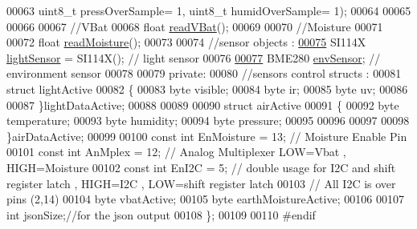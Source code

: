 \begin{DoxyCode}
00063                    uint8\_t pressOverSample= 1,    uint8\_t humidOverSample= 1);
00064 
00065 
00066 
00067     \textcolor{comment}{//VBat}
00068     \textcolor{keywordtype}{float} \hyperlink{class_cool_board_sensors_a6944b6ea7bce8e2fce1b434acfd9d5f3}{readVBat}();
00069 
00070     \textcolor{comment}{//Moisture}
00071 
00072     \textcolor{keywordtype}{float} \hyperlink{class_cool_board_sensors_a8761bff50373c485f4465c8db47d0633}{readMoisture}();
00073 
00074     \textcolor{comment}{//sensor objects :}
\hyperlink{class_cool_board_sensors_a3e397300fb707dd193e909a757bf6102}{00075}     SI114X \hyperlink{class_cool_board_sensors_a3e397300fb707dd193e909a757bf6102}{lightSensor} = SI114X();           \textcolor{comment}{// light sensor }
00076     
\hyperlink{class_cool_board_sensors_a868e38985e9a2412829fa2790ca13e2e}{00077}     BME280 \hyperlink{class_cool_board_sensors_a868e38985e9a2412829fa2790ca13e2e}{envSensor};                  \textcolor{comment}{// environment sensor}
00078     
00079 \textcolor{keyword}{private}:
00080     \textcolor{comment}{//sensors control structs :}
00081     \textcolor{keyword}{struct }lightActive
00082     \{
00083         byte visible;
00084         byte ir;
00085         byte uv;    
00086 
00087     \}lightDataActive;
00088 
00089 
00090     \textcolor{keyword}{struct }airActive
00091     \{
00092         byte temperature;
00093         byte humidity;
00094         byte pressure;
00095 
00096 
00097 
00098     \}airDataActive;
00099 
00100     \textcolor{keyword}{const} \textcolor{keywordtype}{int} EnMoisture = 13;                      \textcolor{comment}{// Moisture Enable Pin}
00101     \textcolor{keyword}{const} \textcolor{keywordtype}{int} AnMplex = 12;                         \textcolor{comment}{// Analog Multiplexer  LOW=Vbat , HIGH=Moisture}
00102     \textcolor{keyword}{const} \textcolor{keywordtype}{int} EnI2C = 5;                            \textcolor{comment}{// double usage for I2C and shift register latch ,
       HIGH=I2C , LOW=shift register latch}
00103                             \textcolor{comment}{// All I2C is over pins (2,14)}
00104         byte vbatActive;
00105     byte earthMoistureActive;
00106 
00107     \textcolor{keywordtype}{int} jsonSize;\textcolor{comment}{//for the json output}
00108 \};
00109 
00110 \textcolor{preprocessor}{#endif}
\end{DoxyCode}
